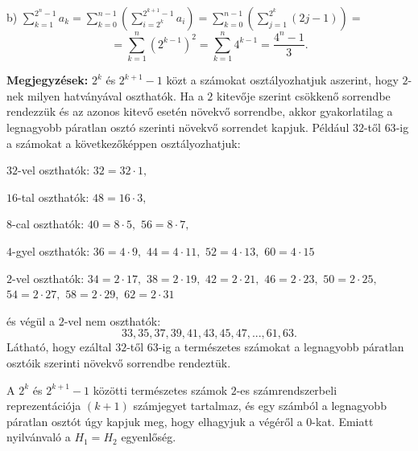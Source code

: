 \documentclass[a4paper,10pt]{article}
\begin{document}
b) $\sum\limits_{k = 1}^{2^n  - 1} {a_k }  = \sum\limits_{k =
0}^{n-1} {\left (\sum\limits_{i = 2^k }^{2^{k+1}  - 1} a_i \right )}
 =\sum\limits_{k = 0}^{n-1} {\left(\sum\limits_{j = 1 }^{2^k} (2j
- 1) \right )}  =$ $$= \sum\limits_{k = 1}^{n} {\left( {2^{k -1} }
\right)} ^2 = \sum\limits_{k = 1}^{n} {4^{k - 1} }  = \frac{{4^n -
1}}{3}.$$

\medskip

\textbf{Megjegyzések: } $2^k$ és $2^{k+1}-1$ közt a számokat
osztályozhatjuk aszerint, hogy $2$-nek milyen hatványával
oszthatók. Ha a $2$ kitevője szerint csökkenő sorrendbe
rendezzük és az azonos kitevő esetén növekvő
sorrendbe, akkor gyakorlatilag a legnagyobb páratlan osztó
szerinti növekvő sorrendet kapjuk. Például $32$-től
$63$-ig a számokat a következőképpen osztályozhatjuk:

$32$-vel oszthatók: $32=32\cdot1,$

$16$-tal oszthatók: $48=16\cdot 3,$

$8$-cal oszthatók: $40=8\cdot5,$ $56=8\cdot 7,$

$4$-gyel oszthatók: $36=4\cdot 9,$ $44=4\cdot11,$ $52=4\cdot13,$
$60=4\cdot 15$

$2$-vel oszthatók: $34=2\cdot 17,$ $38=2\cdot 19,$ $42=2\cdot 21,$
$46=2\cdot 23,$ $50=2\cdot 25,$ $54=2\cdot 27,$ $58=2\cdot 29,$
$62=2\cdot 31$

és végül a $2$-vel nem oszthatók: $$33, 35, 37, 39, 41, 43,
45, 47, ..., 61, 63.$$ Látható, hogy ezáltal $32$-től $63$-ig a
természetes számokat a legnagyobb páratlan osztóik szerinti növekv\H
o sorrendbe rendeztük. 

\smallskip
A $2^k$ és $2^{k+1}-1$ közötti természetes
számok $2$-es számrendszerbeli reprezentációja $(k+1)$
számjegyet tartalmaz, és egy számból a legnagyobb páratlan
osztót úgy kapjuk meg, hogy elhagyjuk a végéről a
$0$-kat. Emiatt nyilvánvaló a $H_1=H_2$ egyenlőség.

\medskip
\end{document}

